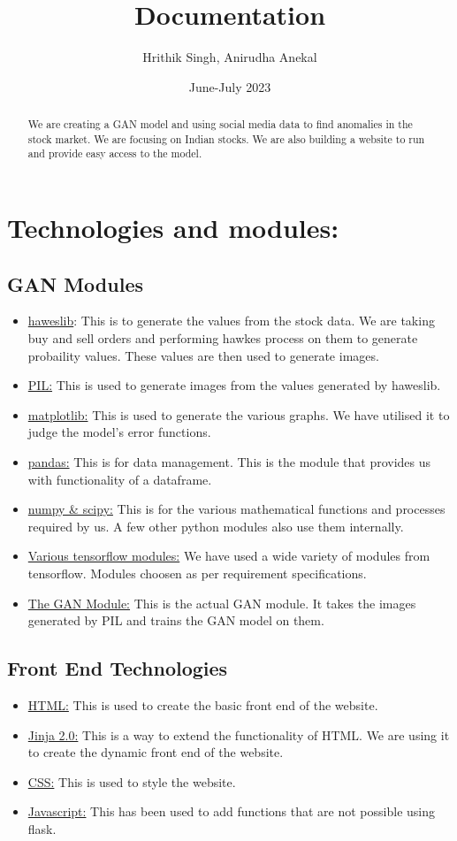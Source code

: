 \documentclass{article}
\begin{document}
\title{Documentation}
\author{Hrithik Singh, Anirudha Anekal}
\date{June-July 2023}
\maketitle
\begin{abstract}
We are creating a GAN model and using social media data to find anomalies in the stock market. We are focusing on Indian stocks. We are also building a website to run and provide easy access to the model.
\end{abstract}
\section{Technologies and modules:}
\subsection{GAN Modules}
\begin{itemize}
\item \underline{haweslib}: This is to generate the values from the stock data. We are taking buy and sell orders and performing hawkes process on them to generate probaility values. These values are then used to generate images.
\item \underline{PIL:} This is used to generate images from the values generated by haweslib.
\item \underline{matplotlib:} This is used to generate the various graphs. We have utilised it to judge the model's error functions.
\item \underline{pandas:} This is for data management. This is the module that provides us with functionality of a dataframe.
\item \underline{numpy \& scipy:} This is for the various mathematical functions and processes required by us. A few other python modules also use them internally.
\item \underline{Various tensorflow modules:} We have used a wide variety of modules from tensorflow. Modules choosen as per requirement specifications.
\item \underline{The GAN Module:} This is the actual GAN module. It takes the images generated by PIL and trains the GAN model on them.
\end{itemize}
\subsection{Front End Technologies}
\begin{itemize}
\item \underline{HTML:} This is used to create the basic front end of the website.
\item \underline{Jinja 2.0:} This is a way to extend the functionality of HTML. We are using it to create the dynamic front end of the website.
\item \underline{CSS:} This is used to style the website.
\item \underline{Javascript:} This has been used to add functions that are not possible using flask.
\end{itemize}
\end{document}
